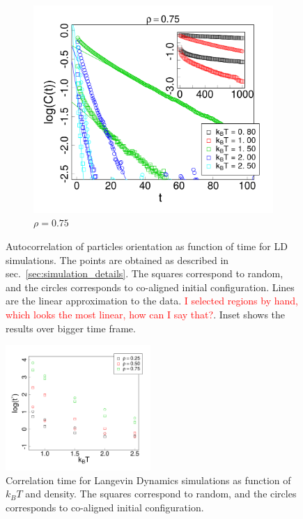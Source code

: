 \begin{figure}[p]
\begin{subfigure}[t]{0.49\textwidth}
		\includegraphics[width=\textwidth]{Images/corr_time_relaxation_75.png}
		\caption{$\rho = 0.75$}
	\end{subfigure}
	\captionsetup{justification=centering, width=0.9\columnwidth}
	\caption{Autocorrelation of particles orientation as function of time for LD simulations. The points are obtained as described in sec.~\ref{sec:simulation_details}. The squares correspond to random, and the circles corresponds to co-aligned initial configuration. Lines are the linear approximation to the data. \textcolor{red}{I selected regions by hand, which looks the most linear, how can I say that?}. Inset shows the results over bigger time frame.}
	\label{fig:autocorrelation}
\end{figure}



\begin{figure}[h]
\centering
	\includegraphics[width=0.49\textwidth]{Images/time_corrs_dif_kbt.png}
	
	\captionsetup{justification=centering, width=0.9\columnwidth}
	\caption{Correlation time for Langevin Dynamics simulations as function of $k_BT$ and density. The squares correspond to random, and the circles corresponds to co-aligned initial configuration.} 
	\label{fig:autocorrelation_time}
\end{figure}




